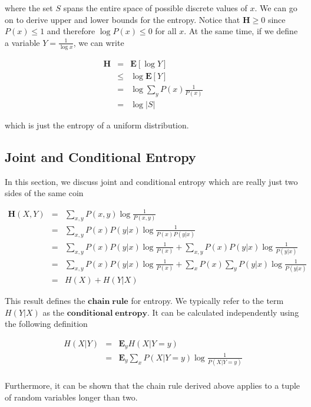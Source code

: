 \documentclass[a4paper,11pt]{book}
\begin{document}
where the set $S$ spans the entire space of possible discrete values of $x$. We can go on to derive upper and lower bounds for the entropy. Notice that $\mathbf{H} \geq 0$ since $P(x) \leq 1$ and therefore $\log P(x) \leq 0$  for all $x$. At the same time, if we define a variable $Y = \frac{1}{\log x}$, we can write

\begin{eqnarray*}
\textbf{H} &=& \mathbf{E}[\log Y]\\
&\leq & \log \mathbf{E}[Y]\\
&=& \log \sum_{y}P(x) \frac{1}{P(x)}\\
&=& \log |S|
\end{eqnarray*}

which is just the entropy of a uniform distribution. 

\subsection{Joint and Conditional Entropy}

In this section, we discuss joint and conditional entropy which are really just two sides of the same coin

\begin{eqnarray*}
\textbf{H}(X,Y) &=& \sum_{x,y} P(x,y)\log \frac{1}{P(x,y)} \\
&=& \sum_{x,y} P(x)P(y|x)\log \frac{1}{P(x)P(y|x)}\\
&=& \sum_{x,y}  P(x)P(y|x)\log \frac{1}{P(x)} + \sum_{x,y}  P(x)P(y|x)\log\frac{1}{P(y|x)} \\
&=& \sum_{x,y}  P(x)P(y|x)\log \frac{1}{P(x)} + \sum_{x}  P(x)\sum_{y}P(y|x)\log\frac{1}{P(y|x)} \\
&=& H(X) + H(Y|X)
\end{eqnarray*}

This result defines the $\mathbf{chain \; rule}$ for entropy. We typically refer to the term $H(Y|X)$ as the $\mathbf{conditional \; entropy}$. It can be calculated independently using the following definition

\begin{eqnarray*}
H(X|Y) &=& \mathbf{E}_{y} H(X|Y=y)\\
&=& \mathbf{E}_{y} \sum_{x} P(X|Y=y)\log \frac{1}{P(X|Y=y)}\\
\end{eqnarray*}


Furthermore, it can be shown that the chain rule derived above applies to a tuple of random variables longer than two. 
\end{document}
